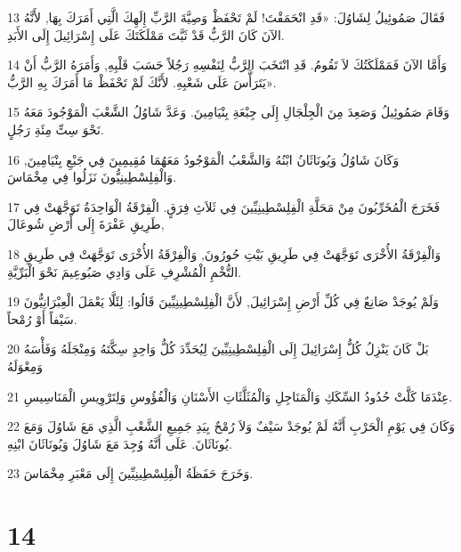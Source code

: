 \par 13 فَقَالَ صَمُوئِيلُ لِشَاوُلَ: «قَدِ انْحَمَقْتَ! لَمْ تَحْفَظْ وَصِيَّةَ الرَّبِّ إِلَهِكَ الَّتِي أَمَرَكَ بِهَا, لأَنَّهُ الآنَ كَانَ الرَّبُّ قَدْ ثَبَّتَ مَمْلَكَتَكَ عَلَى إِسْرَائِيلَ إِلَى الأَبَدِ.
\par 14 وَأَمَّا الآنَ فَمَمْلَكَتُكَ لاَ تَقُومُ. قَدِ انْتَخَبَ الرَّبُّ لِنَفْسِهِ رَجُلاً حَسَبَ قَلْبِهِ, وَأَمَرَهُ الرَّبُّ أَنْ يَتَرَأَّسَ عَلَى شَعْبِهِ. لأَنَّكَ لَمْ تَحْفَظْ مَا أَمَرَكَ بِهِ الرَّبُّ».
\par 15 وَقَامَ صَمُوئِيلُ وَصَعِدَ مِنَ الْجِلْجَالِ إِلَى جِبْعَةِ بِنْيَامِينَ. وَعَدَّ شَاوُلُ الشَّعْبَ الْمَوْجُودَ مَعَهُ نَحْوَ سِتِّ مِئَةِ رَجُلٍ.
\par 16 وَكَانَ شَاوُلُ وَيُونَاثَانُ ابْنُهُ وَالشَّعْبُ الْمَوْجُودُ مَعَهُمَا مُقِيمِينَ فِي جَبْعِ بِنْيَامِينَ, وَالْفِلِسْطِينِيُّونَ نَزَلُوا فِي مِخْمَاسَ.
\par 17 فَخَرَجَ الْمُخَرِّبُونَ مِنْ مَحَلَّةِ الْفِلِسْطِينِيِّينَ فِي ثَلاَثِ فِرَقٍ. الْفِرْقَةُ الْوَاحِدَةُ تَوَجَّهَتْ فِي طَرِيقِ عَفْرَةَ إِلَى أَرْضِ شُوعَالَ,
\par 18 وَالْفِرْقَةُ الأُخْرَى تَوَجَّهَتْ فِي طَرِيقِ بَيْتِ حُورُونَ, وَالْفِرْقَةُ الأُخْرَى تَوَجَّهَتْ فِي طَرِيقِ التُّخْمِ الْمُشْرِفِ عَلَى وَادِي صَبُوعِيمَ نَحْوَ الْبَرِّيَّةِ.
\par 19 وَلَمْ يُوجَدْ صَانِعٌ فِي كُلِّ أَرْضِ إِسْرَائِيلَ, لأَنَّ الْفِلِسْطِينِيِّينَ قَالُوا: لِئَلَّا يَعْمَلَ الْعِبْرَانِيُّونَ سَيْفاً أَوْ رُمْحاً.
\par 20 بَلْ كَانَ يَنْزِلُ كُلُّ إِسْرَائِيلَ إِلَى الْفِلِسْطِينِيِّينَ لِيُحَدِّدَ كُلُّ وَاحِدٍ سِكَّتَهُ وَمِنْجَلَهُ وَفَأْسَهُ وَمِعْوَلَهُ
\par 21 عِنْدَمَا كَلَّتْ حُدُودُ السِّكَكِ وَالْمَنَاجِلِ وَالْمُثَلَّثَاتِ الأَسْنَانِ وَالْفُؤُوسِ وَلِتَرْوِيسِ الْمَنَاسِيسِ.
\par 22 وَكَانَ فِي يَوْمِ الْحَرْبِ أَنَّهُ لَمْ يُوجَدْ سَيْفٌ وَلاَ رُمْحٌ بِيَدِ جَمِيعِ الشَّعْبِ الَّذِي مَعَ شَاوُلَ وَمَعَ يُونَاثَانَ. عَلَى أَنَّهُ وُجِدَ مَعَ شَاوُلَ وَيُونَاثَانَ ابْنِهِ.
\par 23 وَخَرَجَ حَفَظَةُ الْفِلِسْطِينِيِّينَ إِلَى مَعْبَرِ مِخْمَاسَ.

\chapter{14}

